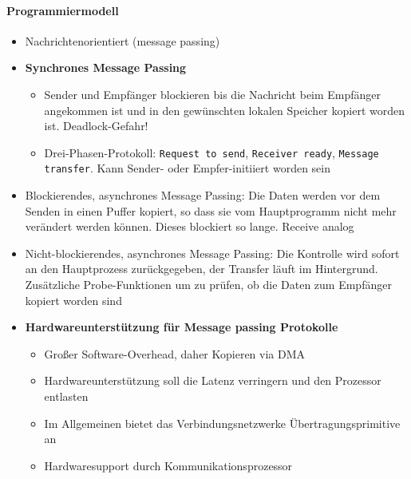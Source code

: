 	\paragraph{Programmiermodell}
		\begin{itemize}
			\item Nachrichtenorientiert (message passing)
			\item \textbf{Synchrones Message Passing}
			\begin{itemize}
				\item Sender und Empfänger blockieren bis die Nachricht beim Empfänger angekommen ist und in den gewünschten lokalen Speicher kopiert worden ist. Deadlock-Gefahr!
				\item Drei-Phasen-Protokoll: \texttt{Request to send}, \texttt{Receiver ready}, \texttt{Message transfer}. Kann Sender- oder Empfer-initiiert worden sein
			\end{itemize}
			\item Blockierendes, asynchrones Message Passing: Die Daten werden vor dem Senden in einen Puffer kopiert, so dass sie vom Hauptprogramm nicht mehr verändert werden können. Dieses blockiert so lange. Receive analog
			\item Nicht-blockierendes, asynchrones Message Passing: Die Kontrolle wird sofort an den Hauptprozess zurückgegeben, der Transfer läuft im Hintergrund. Zusätzliche Probe-Funktionen um zu prüfen, ob die Daten zum Empfänger kopiert worden sind
			\item \textbf{Hardwareunterstützung für Message passing Protokolle}
			\begin{itemize}
				\item Großer Software-Overhead, daher Kopieren via DMA
				\item Hardwareunterstützung soll die Latenz verringern und den Prozessor entlasten
				\item Im Allgemeinen bietet das Verbindungsnetzwerke Übertragungsprimitive an
				\item Hardwaresupport durch Kommunikationsprozessor
			\end{itemize}
		\end{itemize}

